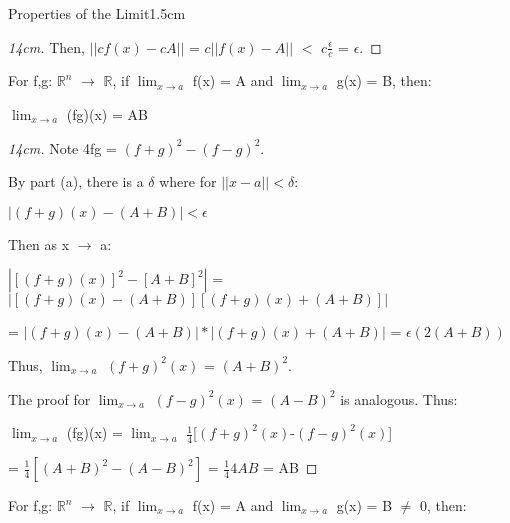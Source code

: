 \begin{ltheorem}{Properties of the Limit}{1.5cm}
\begin{proof}[14cm]
                Then,
                $||cf(x) - cA||$
                = $c||f(x) - A||$
                $<$ $c\frac{\epsilon}{c}$
                = $\epsilon$.
            \end{proof}

            \newpage

        \item For f,g: $\mathbb{R}^n$ $\rightarrow$ $\mathbb{R}$, if
            $\lim_{x \rightarrow a}$ f(x) = A and
            $\lim_{x \rightarrow a}$ g(x) = B, then:

            \hspace{0.5cm}
            $\lim_{x \rightarrow a}$ (fg)(x) = AB

            \begin{proof}[14cm]
                Note 4fg = $(f+g)^2 - (f-g)^2$.

                By part (a), there is a $\delta$ where for $||x-a|| < \delta$:

                \hspace{0.5cm}
                $|(f+g)(x) - (A+B)| < \epsilon$

                Then as x $\rightarrow$ a:

                \hspace{0.5cm}
                $| [(f+g)(x)]^2 - [A+B]^2 |$
                = $| [(f+g)(x) - (A+B)][(f+g)(x) + (A+B)] |$

                \hspace{0.5cm}
                = $| (f+g)(x) - (A+B) | * |(f+g)(x) + (A+B)|$
                = $\epsilon(2(A+B))$

                Thus, $\lim_{x \rightarrow a}$ $(f+g)^2(x)$ = $(A+B)^2$.

                The proof for $\lim_{x \rightarrow a}$ $(f-g)^2(x)$ = $(A-B)^2$
                is analogous.
                Thus:

                \hspace{0.5cm}
                $\lim_{x \rightarrow a}$ (fg)(x)
                = $\lim_{x \rightarrow a}$ $\frac{1}{4}$[$(f+g)^2(x)$-$(f-g)^2(x)$]
                
                \hspace{0.5cm}
                = $\frac{1}{4}[(A+B)^2 - (A-B)^2]$
                = $\frac{1}{4}4AB$
                = AB
            \end{proof}

        \item For f,g: $\mathbb{R}^n$ $\rightarrow$ $\mathbb{R}$, if
            $\lim_{x \rightarrow a}$ f(x) = A and
            $\lim_{x \rightarrow a}$ g(x) = B $\not =$ 0, then:


\end{ltheorem}
